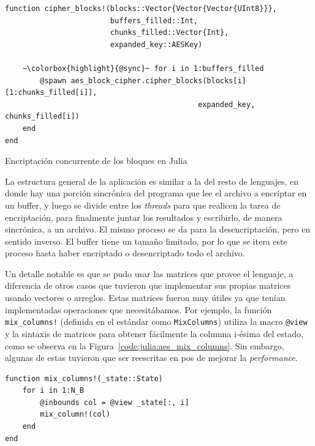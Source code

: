 \documentclass[11pt]{article}
\newcommand{\english}[1]{\textit{#1}}
\begin{document}
\begin{listing}[h]
\begin{verbatim}
function cipher_blocks!(blocks::Vector{Vector{Vector{UInt8}}},
                        buffers_filled::Int,
                        chunks_filled::Vector{Int},
                        expanded_key::AESKey)

    ~\colorbox{highlight}{@sync}~ for i in 1:buffers_filled
        @spawn aes_block_cipher.cipher_blocks(blocks[i][1:chunks_filled[i]],
                                            expanded_key, chunks_filled[i])
    end
end
\end{verbatim}
\caption{Encriptación concurrente de los bloques en Julia}
\label{code:julia:aes_concurrent}
\end{listing}

La estructura general de la aplicación es similar a la del resto de lenguajes, en donde hay una porción sincrónica del programa que lee el archivo a encriptar en un buffer, y luego se divide entre los \english{threads} para que realicen la tarea de encriptación, para finalmente juntar los resultados y escribirlo, de manera sincrónica, a un archivo. El mismo proceso se da para la desencriptación, pero en sentido inverso. El buffer tiene un tamaño limitado, por lo que se itera este proceso hasta haber encriptado o desencriptado todo el archivo.

Un detalle notable es que se pudo usar las matrices que provee el lenguaje, a diferencia de otros casos que tuvieron que implementar sus propias matrices usando vectores o arreglos. Estas matrices fueron muy útiles ya que tenían implementadas operaciones que necesitábamos. Por ejemplo, la función \lstinline{mix_columns!} (definida en el estándar como \lstinline{MixColumns}) utiliza la macro \lstinline{@view} y la sintaxis de matrices para obtener fácilmente la columna i-ésima del estado, como se observa en la Figura~\ref{code:julia:aes_mix_columns}. Sin embargo, algunas de estas tuvieron que ser reescritas en pos de mejorar la \english{performance}.

\begin{listing}[h]
\begin{verbatim}
function mix_columns!(_state::State)
    for i in 1:N_B
        @inbounds col = @view _state[:, i]
        mix_column!(col)
    end
end
\end{verbatim}
\caption{Implementación de la función \lstinline{mix_columns!} en Julia}
\label{code:julia:aes_mix_columns}
\end{listing}
\end{document}
